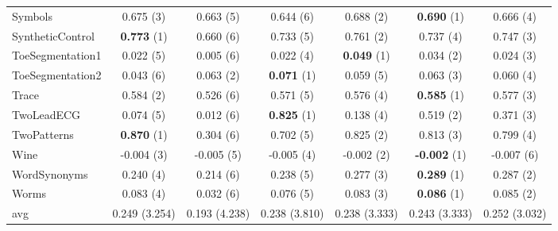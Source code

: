 \begin{table}[ht]
\begin{adjustbox}{width=\textwidth}
\begin{tabular}{lcccccc}
    Symbols & 0.675 (3) & 0.663 (5) & 0.644 (6) & 0.688 (2) & \textbf{0.690} (1) & 0.666 (4) \\
    SyntheticControl & \textbf{0.773} (1) & 0.660 (6) & 0.733 (5) & 0.761 (2) & 0.737 (4) & 0.747 (3) \\
    ToeSegmentation1 & 0.022 (5) & 0.005 (6) & 0.022 (4) & \textbf{0.049} (1) & 0.034 (2) & 0.024 (3) \\
    ToeSegmentation2 & 0.043 (6) & 0.063 (2) & \textbf{0.071} (1) & 0.059 (5) & 0.063 (3) & 0.060 (4) \\
    Trace & 0.584 (2) & 0.526 (6) & 0.571 (5) & 0.576 (4) & \textbf{0.585} (1) & 0.577 (3) \\
    TwoLeadECG & 0.074 (5) & 0.012 (6) & \textbf{0.825} (1) & 0.138 (4) & 0.519 (2) & 0.371 (3) \\
    TwoPatterns & \textbf{0.870} (1) & 0.304 (6) & 0.702 (5) & 0.825 (2) & 0.813 (3) & 0.799 (4) \\
    Wine & -0.004 (3) & -0.005 (5) & -0.005 (4) & -0.002 (2) & \textbf{-0.002} (1) & -0.007 (6) \\
    WordSynonyms & 0.240 (4) & 0.214 (6) & 0.238 (5) & 0.277 (3) & \textbf{0.289} (1) & 0.287 (2) \\
    Worms & 0.083 (4) & 0.032 (6) & 0.076 (5) & 0.083 (3) & \textbf{0.086} (1) & 0.085 (2) \\
    \hline 
    avg & 0.249 (3.254) & 0.193 (4.238) & 0.238 (3.810) & 0.238 (3.333) & 0.243 (3.333) & 0.252 (3.032) \\ 
    \hline
    \end{tabular}
    \end{adjustbox}
    \end{table}
    